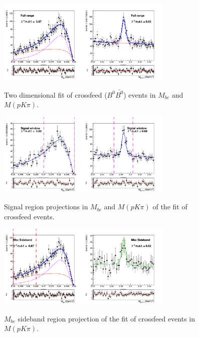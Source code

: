 \begin{figure}[H]
\centering
{\includegraphics[width=0.75\textwidth]{06-chargedAnticorrBtoLambda/figs/stream02345_Crossfeed_charged_anticorrLambdaC_2Dfit.png}}
\caption{Two dimensional fit of crossfeed ($B^0\bar{B^0}$) events in $M_{bc}$  and $M(p K \pi)$.}
\label{fig:stream02345_Crossfeed_charged_anticorrLambdaC_2Dfit}
\end{figure}


\begin{figure}[H]
\centering
{\includegraphics[width=0.75\textwidth]{06-chargedAnticorrBtoLambda/figs/Signal_window_stream02345_Crossfeed_charged_anticorrLambdaC_2Dfit.png}}
\caption{Signal region projections in $M_{bc}$ and $M(p K \pi)$  of the fit of crossfeed events.}
\label{fig:Signal_window_stream02345_Crossfeed_charged_anticorrLambdaC_2Dfit}
\end{figure}

\begin{figure}[H]
\centering
{\includegraphics[width=0.75\textwidth]{06-chargedAnticorrBtoLambda/figs/Mbc_Sideband_stream02345_Crossfeed_charged_anticorrLambdaC_2Dfit.png}}
\caption{$M_{bc}$ sideband region projection of the fit of crossfeed events in $M(p K \pi)$.}
\label{fig:Mbc_Sideband_stream02345_Crossfeed_charged_anticorrLambdaC_2Dfit}
\end{figure}



